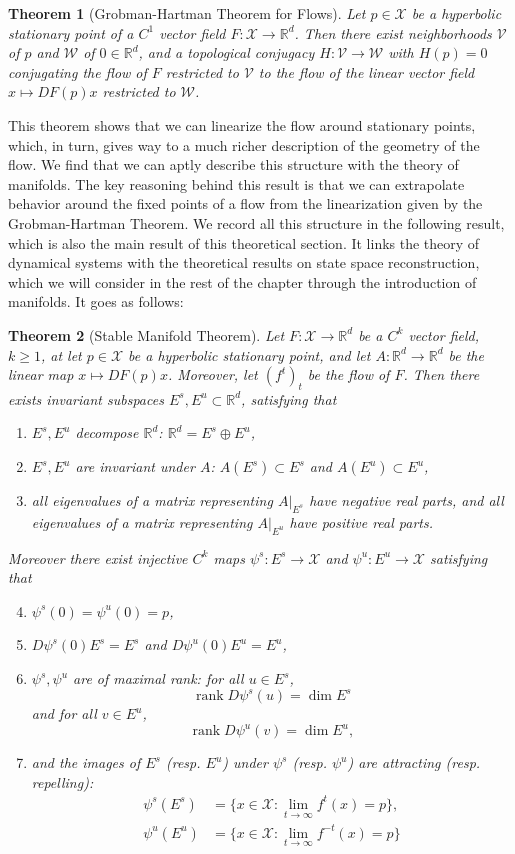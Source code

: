 \documentclass[11pt, a4paper]{memoir}
\theoremstyle{break}
\newtheorem{thm}{Theorem}
\theoremstyle{break}
\theoremstyle{nonumberplain}
\newcommand{\mR}{\mathbb{R}}
\DeclareMathOperator{\rank}{rank}
\begin{document}
\begin{thm}[Grobman-Hartman Theorem for Flows]
Let $p\in \mathcal{X}$ be a hyperbolic stationary point of a $C^1$ vector field $F:\mathcal{X}\to\mR^d$. Then there exist neighborhoods $\mathcal{V}$ of $p$ and $\mathcal{W}$ of $0\in \mR^d$, and a topological conjugacy $H:\mathcal{V}\to\mathcal{W}$ with $H(p)=0$ conjugating the flow of $F$ restricted to $\mathcal{V}$ to the flow of the linear vector field $x\mapsto DF(p)x$ restricted to $\mathcal{W}$.
\end{thm}
This theorem shows that we can linearize the flow around stationary points, which, in turn, gives way to a much richer description of the geometry of the flow. We find that we can aptly describe this structure with the theory of manifolds. The key reasoning behind this result is that we can extrapolate behavior around the fixed points of a flow from the linearization given by the Grobman-Hartman Theorem. We record all this structure in the following result, which is also the main result of this theoretical section. It links the theory of dynamical systems with the theoretical results on state space reconstruction, which we will consider in the rest of the chapter through the introduction of manifolds. It goes as follows:
\begin{thm}[Stable Manifold Theorem]\label{stable}
Let $F:\mathcal{X}\to \mR^d$ be a $C^k$ vector field, $k\geqslant 1$, at let $p\in \mathcal{X}$ be a hyperbolic stationary point, and let $A:\mR^d\to\mR^d$ be the linear map $x\mapsto DF(p)x$. Moreover, let $(f^t)_t$ be the flow of $F$. Then there exists invariant subspaces $E^s,E^u\subset\mR^d$, satisfying that 
\begin{enumerate}[label=(\roman*)]
	\item $E^s,E^u$ decompose $\mR^d$: $\mR^d=E^s\oplus E^u$,
	\item $E^s,E^u$ are invariant under $A$: $A(E^s)\subset E^s$ and $A(E^u)\subset E^u$,
	\item all eigenvalues of a matrix representing $A|_{E^s}$ have negative real parts, and all eigenvalues of a matrix representing $A|_{E^u}$ have positive real parts.
\end{enumerate}
Moreover there exist injective $C^k$ maps $\psi^s: E^s\to \mathcal{X}$ and $\psi^u:E^u\to\mathcal{X}$ satisfying that
\begin{enumerate}[label=(\roman*)]
\setcounter{enumi}{3}
	\item $\psi^s(0)=\psi^u(0)=p$,
	\item $D\psi^s(0)E^s=E^s$ and  $D\psi^u(0)E^u=E^u$,
 \item $\psi^s,\psi^u$ are of maximal rank: for all $u\in E^s$, $$\rank D\psi^s(u)=\dim E^s$$ and for all $v\in E^u$, $$\rank D\psi^u(v)=\dim E^u,$$
 \item and the images of $E^s$ (resp. $E^u$) under $\psi^s$ (resp. $\psi^u$) are attracting (resp. repelling):
 \begin{align*}
  \psi^s(E^s)&=\{x\in \mathcal{X}:\lim_{t\to\infty}f^t(x)=p\},\\
 \psi^u(E^u)&=\{x\in \mathcal{X}:\lim_{t\to\infty}f^{-t}(x)=p\}
 \end{align*}
\end{enumerate}
\end{thm}
\end{document}
